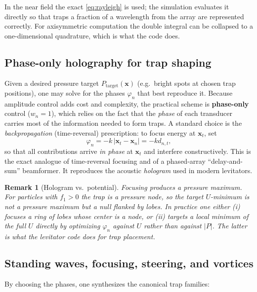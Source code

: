 \documentclass[11pt]{article}
\newtheorem{remark}{Remark}[section]
\newcommand{\xx}{\mathbf{x}}
\begin{document}
In the near field the exact \eqref{eq:rayleigh} is used; the simulation
evaluates it directly so that traps a fraction of a wavelength from the array
are represented correctly. For axisymmetric computation the double integral can
be collapsed to a one-dimensional quadrature, which is what the code does.

\subsection{Phase-only holography for trap shaping}

Given a desired pressure target $P_{\mathrm{target}}(\xx)$ (e.g.\ bright spots
at chosen trap positions), one may solve for the phases $\varphi_{n}$ that best
reproduce it. Because amplitude control adds cost and complexity, the practical
scheme is \textbf{phase-only} control ($w_{n}=1$), which relies on the fact that
the \emph{phase} of each transducer carries most of the information needed to
form traps. A standard choice is the \emph{backpropagation} (time-reversal)
prescription: to focus energy at $\xx_{t}$, set
\begin{equation}
  \varphi_{n}=-k\,|\xx_{t}-\xx_{n}|=-k d_{n,t},
  \label{eq:backprop}
\end{equation}
so that all contributions arrive \emph{in phase} at $\xx_{t}$ and interfere
constructively. This is the exact analogue of time-reversal focusing and of a
phased-array ``delay-and-sum'' beamformer. It reproduces the acoustic
\emph{hologram} used in modern levitators.

\begin{remark}[Hologram vs.\ potential]
Focusing produces a pressure \emph{maximum}. For particles with $f_{1}>0$ the
trap is a pressure \emph{node}, so the target $U$-minimum is not a pressure
maximum but a \emph{null flanked by lobes}. In practice one either (i) focuses a
\emph{ring} of lobes whose center is a node, or (ii) targets a local minimum of
the full $U$ directly by optimizing $\varphi_{n}$ against $U$ rather than
against $|P|$. The latter is what the levitator code does for trap placement.
\end{remark}

\subsection{Standing waves, focusing, steering, and vortices}

By choosing the phases, one synthesizes the canonical trap families:
\end{document}
